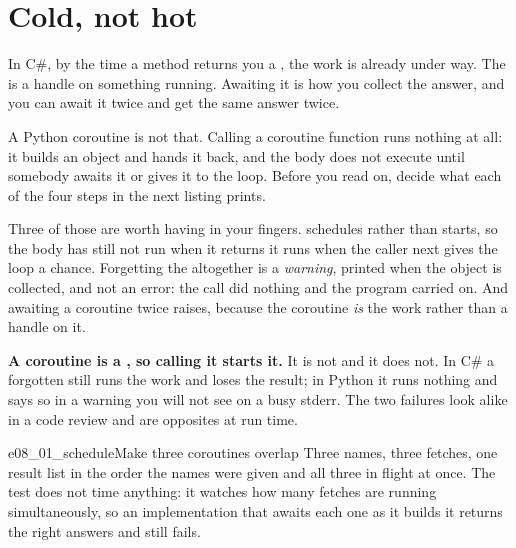 \section{Cold, not hot}
\label{sec:asyncio-cold}

In C\#, by the time a method returns you a , the work is
already under way. The  is a handle on something running.
Awaiting it is how you collect the answer, and you can await it twice and
get the same answer twice.

A Python coroutine is not that. Calling a coroutine function runs nothing
at all: it builds an object and hands it back, and the body does not
execute until somebody awaits it or gives it to the loop. Before you read
on, decide what each of the four steps in the next listing prints.



\noindent
Three of those are worth having in your fingers. 
schedules rather than starts, so the body has still not run when it
returns \dash{} it runs when the caller next gives the loop a chance.
Forgetting the  altogether is a \emph{warning}, printed when
the object is collected, and not an error: the call did nothing and the
program carried on. And awaiting a coroutine twice raises, because the
coroutine \emph{is} the work rather than a handle on it.


\begin{trapbox}
\textbf{A coroutine is a , so calling it starts it.} It is not
and it does not. In C\# a forgotten  still runs the work and
loses the result; in Python it runs nothing and says so in a warning you
will not see on a busy stderr. The two failures look alike in a code
review and are opposites at run time.
\end{trapbox}

\begin{exercise}{e08_01_schedule}{Make three coroutines overlap}
Three names, three fetches, one result list in the order the names were
given \dash{} and all three in flight at once. The test does not time
anything: it watches how many fetches are running simultaneously, so an
implementation that awaits each one as it builds it returns the right
answers and still fails.
\end{exercise}

